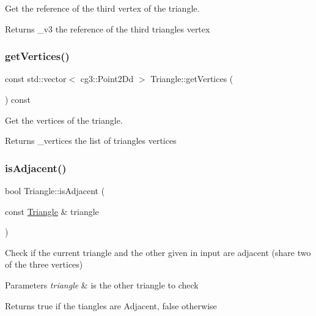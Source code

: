 Get the reference of the third vertex of the triangle. 

\begin{DoxyReturn}{Returns}
\+\_\+v3 the reference of the third triangle\textquotesingle{}s vertex 
\end{DoxyReturn}
\mbox{\label{classTriangle_aba56c2fbfb76c584343eef793e437bb7}} 
\subsubsection{\texorpdfstring{get\+Vertices()}{getVertices()}}
{\footnotesize\ttfamily const std\+::vector$<$ cg3\+::\+Point2\+Dd $>$ Triangle\+::get\+Vertices (\begin{DoxyParamCaption}{ }\end{DoxyParamCaption}) const\hspace{0.3cm}{\ttfamily [inline]}}



Get the vertices of the triangle. 

\begin{DoxyReturn}{Returns}
\+\_\+vertices the list of triangle\textquotesingle{}s vertices 
\end{DoxyReturn}
\mbox{\label{classTriangle_a3d6e11f16208fb48d84bd7e2381d42cf}} 
\subsubsection{\texorpdfstring{is\+Adjacent()}{isAdjacent()}}
{\footnotesize\ttfamily bool Triangle\+::is\+Adjacent (\begin{DoxyParamCaption}\item[{const \hyperlink{classTriangle}{Triangle} \&}]{triangle }\end{DoxyParamCaption})\hspace{0.3cm}{\ttfamily [inline]}}



Check if the current triangle and the other given in input are adjacent (share two of the three vertices) 


\begin{DoxyParams}{Parameters}
{\em triangle} & is the other triangle to check \\
\hline
\end{DoxyParams}
\begin{DoxyReturn}{Returns}
true if the tiangles are Adjacent, false otherwise 
\end{DoxyReturn}
\mbox{\label{classTriangle_a09755b9bde993025210c04f6b4b90896}} 
